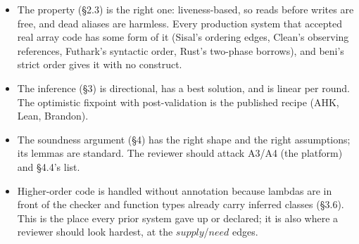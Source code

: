 \begin{itemize}
\item The property (§2.3) is the right one: liveness-based, so reads before writes are free, and dead aliases are harmless. Every production system that accepted real array code has some form of it (Sisal's ordering edges, Clean's observing references, Futhark's syntactic order, Rust's two-phase borrows), and beni's strict order gives it with no construct.
\item The inference (§3) is directional, has a best solution, and is linear per round. The optimistic fixpoint with post-validation is the published recipe (AHK, Lean, Brandon).
\item The soundness argument (§4) has the right shape and the right assumptions; its lemmas are standard. The reviewer should attack A3/A4 (the platform) and §4.4's list.
\item Higher-order code is handled without annotation because lambdas are in front of the checker and function types already carry inferred classes (§3.6). This is the place every prior system gave up or declared; it is also where a reviewer should look hardest, at the $\mathit{supply}$/$\mathit{need}$ edges.
\end{itemize}


